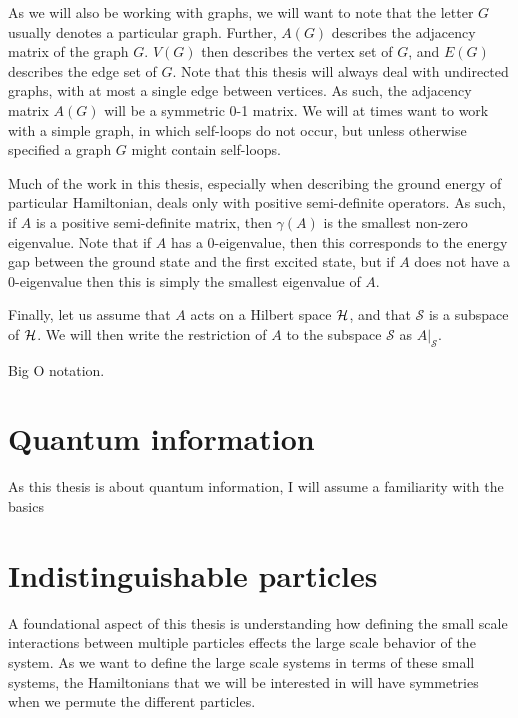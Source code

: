 \documentclass[../thesis-main/thesis-main]{subfiles}
\begin{document}
As we will also be working with graphs, we will want to note that the letter $G$ usually denotes a particular graph.  Further, $A(G)$ describes the adjacency matrix of the graph $G$.  $V(G)$ then describes the vertex set of $G$, and $E(G)$ describes the edge set of $G$.  Note that this thesis will always deal with undirected graphs, with at most a single edge between vertices.  As such, the adjacency matrix $A(G)$ will be a symmetric 0-1 matrix.  We will at times want to work with a simple graph, in which self-loops do not occur, but unless otherwise specified a graph $G$ might contain self-loops.


Much of the work in this thesis, especially when describing the ground energy of particular Hamiltonian, deals only with positive semi-definite operators.  As such, if $A$ is a positive semi-definite matrix, then $\gamma(A)$ is the smallest non-zero eigenvalue.   Note that if $A$ has a 0-eigenvalue, then this corresponds to the energy gap between the ground state and the first excited state, but if $A$ does not have a 0-eigenvalue then this is simply the smallest eigenvalue of $A$.

Finally, let us assume that $A$ acts on a Hilbert space $\mathcal{H}$, and that $\mathcal{S}$ is a subspace of $\mathcal{H}$.  We will then write the restriction of $A$ to the subspace $\mathcal{S}$ as $A\big|_\mathcal{S}$. 

Big O notation.

\section{Quantum information}
\label{sec:quantum_information}

As this thesis is about quantum information, I will assume a familiarity with the basics 

\section{Indistinguishable particles}
\label{sec:indistinguishable_particles}

A foundational aspect of this thesis is understanding how defining the small scale interactions between multiple particles effects the large scale behavior of the system.  As we want to define the large scale systems in terms of these small systems, the Hamiltonians that we will be interested in will have symmetries when we permute the different particles.
\end{document}
